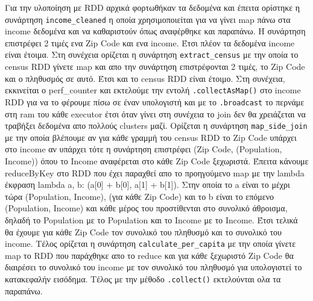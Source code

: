 \documentclass[12pt, a4paper]{article}
\begin{document}
Για την υλοποίηση με RDD αρχικά φορτωθήκαν τα δεδομένα και έπειτα ορίστηκε η συνάρτηση 
\texttt{income\_cleaned} η οποία χρησιμοποιείται για να γίνει map πάνω στα income δεδομένα
και να καθαριστούν όπως αναφέρθηκε και παραπάνω. Η συνάρτηση επιστρέφει 2 τιμές
ενα Zip Code και ενα income. Έτσι πλέον τα δεδομένα income είναι έτοιμα. Στη
συνέχεια ορίζεται η συνάρτηση \texttt{extract\_census} με την οποία το 
census RDD γίνετε map και απο την συνάρτηση επιστρέφονται 2 τιμές, το Zip Code
και ο πληθυσμός σε αυτό. Έτσι και το census RDD είναι έτοιμο. Στη συνέχεια,
εκκινείται ο perf\_counter και εκτελούμε την εντολή \texttt{.collectAsMap()}
στο income RDD για να το φέρουμε πίσω σε έναν υπολογιστή και με το \texttt{.broadcast}
το περνάμε στη ram του κάθε executor έτσι όταν γίνει στη συνέχεια το join δεν 
θα χρειάζεται να τραβήξει δεδομένα απο πολλούς clusters μαζί. Ορίζεται η συνάρτηση
\texttt{map\_side\_join} με την οποία βλέπουμε αν για κάθε γραμμή του census RDD
το Zip Code υπάρχει στο income αν υπάρχει τότε η συνάρτηση επιστρέφει (Zip Code, (Population, Income))
όπου το Income αναφέρεται στο κάθε Zip Code ξεχωριστά. Έπειτα κάνουμε reduceByKey στο
RDD που έχει παραχθεί απο το προηγούμενο map με την lambda έκφραση lambda a, b: (a[0] + b[0], a[1] + b[1]).
Στην οποία το a είναι το μέχρι τώρα (Population, Income), (για κάθε  Zip Code) και 
το b είναι το επόμενο (Population, Income) και κάθε μέρος του προστίθενται στο συνολικό
άθροισμα, δηλαδή το Population με το Population και το Income με το Income. Έτσι τελικά
θα έχουμε για κάθε Zip Code τον συνολικό του πληθυσμό και το συνολικό του income. Τέλος
ορίζεται η συνάρτηση \texttt{calculate\_per\_capita} με την οποία γίνετε map 
το RDD που παράχθηκε απο το reduce και για κάθε ξεχωριστό Zip Code θα διαιρέσει
το συνολικό του income με τον συνολικό του πληθυσμό για υπολογιστεί το κατακεφαλήν
εισόδημα. Τέλος με την μέθοδο \texttt{.collect()} εκτελούνται ολα τα παραπάνω.
\end{document}
